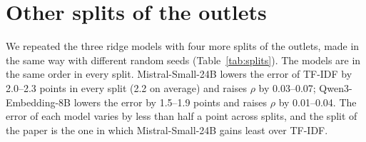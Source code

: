 \documentclass[11pt,a4paper]{article}
\begin{document}
\begin{table}[h]
\centering\small
\caption{Robustness checks. Each row is a check and each column a model; the cells give the MAE per outlet and, in
parentheses, the difference from TF-IDF in the same row (negative: better than TF-IDF).}\label{tab:robust}
\end{table}

\section{Other splits of the outlets}\label{app:splits}
We repeated the three ridge models with four more splits of the outlets, made in the same way with different random
seeds (Table~\ref{tab:splits}). The models are in the same order in every split. Mistral-Small-24B lowers the error of
TF-IDF by 2.0--2.3 points in every split (2.2 on average) and raises $\rho$ by 0.03--0.07; Qwen3-Embedding-8B lowers the
error by 1.5--1.9 points and raises $\rho$ by 0.01--0.04. The error of each model varies by less than half a point
across splits, and the split of the paper is the one in which Mistral-Small-24B gains least over TF-IDF.
\end{document}
